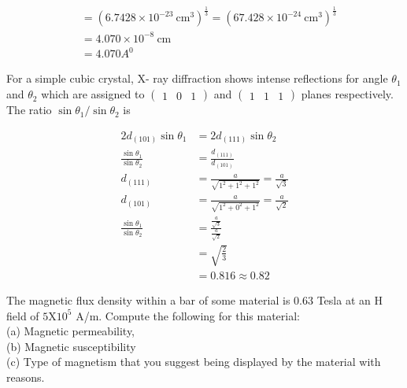 \begin{enumerate}
\begin{answer}
$$\begin{aligned}
		&=\left(6.7428 \times 10^{-23} \mathrm{~cm}^{3}\right)^{\frac{1}{3}}=\left(67.428 \times 10^{-24} \mathrm{~cm}^{3}\right)^{\frac{1}{3}} \\
		&=4.070 \times 10^{-8} \mathrm{~cm} \\
		&=4.070 A^{0}
		\end{aligned}
		$$	
	\end{answer}
	\begin{minipage}{\textwidth}
		\item For a simple cubic crystal, X- ray diffraction shows intense reflections for angle $\theta_{1}$ and $\theta_{2}$ which are assigned to $\left(\begin{array}{lll}1 & 0 & 1\end{array}\right)$ and $\left(\begin{array}{lll}1 & 1 & 1\end{array}\right)$ planes respectively. The ratio $\sin \theta_{1} / \sin \theta_{2}$ is
	\end{minipage}
	\begin{answer}
		$$
		\begin{aligned}
		2 d_{(101)} \sin \theta_{1} &=2 d_{(111)} \sin \theta_{2} \\
		\frac{\sin \theta_{1}}{\sin \theta_{2}} &=\frac{d_{(111)}}{d_{(101)}} \\
		d_{(111)} &=\frac{a}{\sqrt{1^{2}+1^{2}+1^{2}}}=\frac{a}{\sqrt{3}} \\
		d_{(101)} &=\frac{a}{\sqrt{1^{2}+0^{2}+1^{2}}}=\frac{a}{\sqrt{2}} \\
		\frac{\sin \theta_{1}}{\sin \theta_{2}} &=\frac{\frac{a}{\sqrt{3}}}{\frac{a}{\sqrt{2}}} \\
		&=\sqrt{\frac{2}{3}} \\
		&=0.816 \approx 0.82
		\end{aligned}
		$$	
	\end{answer}
	\begin{minipage}{\textwidth}
		\item The magnetic flux density within a bar of some material is $0.63$ Tesla at an $\mathrm{H}$ field of $5 \mathrm{X} 10^{5}$ A/m. Compute the following for this material:\\ (a) Magnetic permeability, \\(b) Magnetic susceptibility\\ (c) Type of magnetism that you suggest being displayed by the material with reasons.
	\end{minipage}
	\begin{answer}$\left. \right. $\\

\end{answer}
\end{enumerate}
